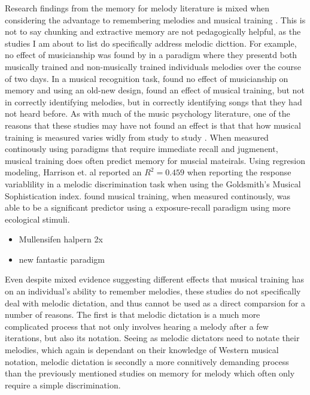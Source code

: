 \documentclass[]{book}
\providecommand{\tightlist}{%
  \setlength{\itemsep}{0pt}\setlength{\parskip}{0pt}}
\begin{document}
Research findings from the memory for melody literature is mixed when considering the advantage to remembering melodies and musical training \citep{halpernMemoryMelodies2010}.
This is not to say chunking and extractive memory are not pedagogically helpful, as the studies I am about to list do specifically address melodic dicttion.
For example, no effect of musicianship was found by \citet{mcauleyPlayItAgain2004} in a paradigm where they presentd both musically trained and non-musically trained individuals melodies over the course of two days.
In a musical recognition task, \citep{korenmanRoleFamiliarityEpisodic2004} found no effect of musicianship on memory and using an old-new design, \citep{munganLevelsofProcessingEffectsRemember2011} found an effect of musical training, but not in correctly identifying melodies, but in correctly identifying songs that they had not heard before.
As with much of the music psychology literature, one of the reasons that these studies may have not found an effect is that that how musical training is measured varies widly from study to study \citep{talaminiMusiciansHaveBetter2017}.
When measured continously using paradigms that require immediate recall and jugmenent, musical training does often predict memory for muscial mateirals.
Using regresion modeling, Harrison et. al reported an \(R^2 = 0.459\) when reporting the response variablility in a melodic discrimination task \citep{harrisonApplyingModernPsychometric2017a} when using the Goldsmith's Musical Sophistication index.
\citet{bakerPerceptionLeitmotivesRichard2017} found musical training, when measured continously, was able to be a significant predictor using a exposure-recall paradigm using more ecological stimuli.

\begin{itemize}
\tightlist
\item
  Mullensifen halpern 2x
\item
  new fantastic paradigm
\end{itemize}

Even despite mixed evidence suggesting different effects that musical training has on an individual's ability to remember melodies, these studies do not specifically deal with melodic dictation, and thus cannot be used as a direct comparsion for a number of reasons.
The first is that melodic dictation is a much more complicated process that not only involves hearing a melody after a few iterations, but also its notation.
Seeing as melodic dictators need to notate their melodies, which again is dependant on their knowledge of Western musical notation, melodic dictation is secondly a more connitively demanding process than the previously mentioned studies on memory for melody which often only require a simple discrimination.
\end{document}
